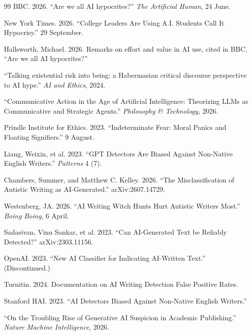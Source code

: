 \documentclass[12pt,a4paper]{article}
\begin{document}
\begin{thebibliography}{99}
BBC. 2026. ``Are we all AI hypocrites?'' \emph{The Artificial Human}, 24 June.

New York Times. 2026. ``College Leaders Are Using A.I. Students Call It Hypocrisy.'' 29 September.

Hallsworth, Michael. 2026. Remarks on effort and value in AI use, cited in BBC, ``Are we all AI hypocrites?''

``Talking existential risk into being: a Habermasian critical discourse perspective to AI hype.'' \emph{AI and Ethics}, 2024.

``Communicative Action in the Age of Artificial Intelligence: Theorizing LLMs as Communicative and Strategic Agents.'' \emph{Philosophy \& Technology}, 2026.

Prindle Institute for Ethics. 2023. ``Indeterminate Fear: Moral Panics and Floating Signifiers.'' 9 August.

Liang, Weixin, et al. 2023. ``GPT Detectors Are Biased Against Non-Native English Writers.'' \emph{Patterns} 4 (7).

Chambers, Summer, and Matthew C. Kelley. 2026. ``The Misclassification of Autistic Writing as AI-Generated.'' arXiv:2607.14729.

Westenberg, JA. 2026. ``AI Writing Witch Hunts Hurt Autistic Writers Most.'' \emph{Boing Boing}, 6 April.

Sadasivan, Vinu Sankar, et al. 2023. ``Can AI-Generated Text be Reliably Detected?'' arXiv:2303.11156.

OpenAI. 2023. ``New AI Classifier for Indicating AI-Written Text.'' (Discontinued.)

Turnitin. 2024. Documentation on AI Writing Detection False Positive Rates.

Stanford HAI. 2023. ``AI Detectors Biased Against Non-Native English Writers.''

``On the Troubling Rise of Generative AI Suspicion in Academic Publishing.'' \emph{Nature Machine Intelligence}, 2026.


\end{thebibliography}
\end{document}
